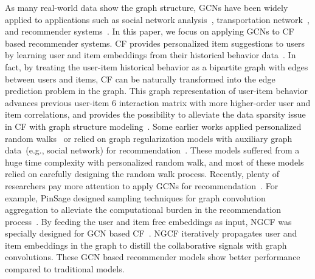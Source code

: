 \documentclass[letterpaper]{article} %
\begin{document}
As many real-world data show the graph structure, GCNs have been widely applied to applications such as social network analysis~\cite{xu2019relation}, transportation network~\cite{zhao2019t}, and recommender systems~\cite{kdd2018GCMC}. In this paper, we focus on applying GCNs to CF based recommender systems. CF provides personalized item suggestions to users by learning user and item embeddings from their historical behavior data~\cite{UAI2009bpr,WWW2017neural}. In fact, by treating the user-item historical behavior as a bipartite graph with edges between users and items, CF can be naturally transformed into the edge prediction problem in the graph. This graph representation of user-item behavior advances previous user-item
6
 interaction matrix with more higher-order user and item correlations, and provides the possibility to alleviate the data sparsity issue in CF with graph structure modeling~\cite{sigir2019ngcf,kdd2018GCMC,kdd2018Pinsage}. Some earlier works applied personalized random walks~\cite{SIGIR2008eigenrank} or relied on graph regularization models with auxiliary graph data~(e.g., social network) for recommendation~\cite{SDM2010collaborative,huang2004graph}. These models suffered from a huge time complexity with personalized random walk, and most of these models relied on carefully designing the random walk process. Recently, plenty of researchers pay more attention  to apply
GCNs for recommendation~\cite{kdir18,sigir2019ngcf,kdd2018GCMC,kdd2018Pinsage}. For example, PinSage designed sampling techniques for graph convolution aggregation to alleviate the computational burden in the recommendation process~\cite{kdd2018Pinsage}. By feeding the user and item free embeddings as input, NGCF was specially designed for GCN based CF~\cite{sigir2019ngcf}. NGCF iteratively propagates user and item embeddings in the graph to distill the collaborative signals with graph convolutions.
These GCN based recommender models show better performance compared to traditional models.
\end{document}
